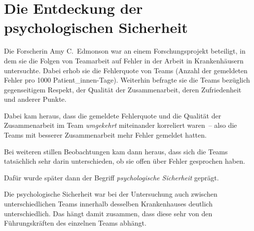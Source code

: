 \section{Die Entdeckung der psychologischen Sicherheit}
\label{ps-entdeckung}

Die Forscherin Amy C.~Edmonson \cite{the-fearless-organisation} war an einem Forschungsprojekt beteiligt, in dem sie die Folgen von Teamarbeit auf Fehler in der Arbeit in Krankenhäusern untersuchte. Dabei erhob sie die Fehlerquote von Teams (Anzahl der gemeldeten Fehler pro 1000 Patient\_innen-Tage). Weiterhin befragte sie die Teams bezüglich gegenseitigem Respekt, der Qualität der Zusammenarbeit, deren Zufriedenheit und anderer Punkte.

Dabei kam heraus, dass die gemeldete Fehlerquote und die Qualität der Zusammenarbeit im Team \emph{umgekehrt} miteinander korreliert waren~-- also die Teams mit besserer Zusammenarbeit mehr Fehler gemeldet hatten.

Bei weiteren stillen Beobachtungen kam dann heraus, dass sich die Teams tatsächlich sehr darin unterschieden, ob sie offen über Fehler gesprochen haben.

Dafür wurde später dann der Begriff \emph{psychologische Sicherheit} geprägt.

Die psychologische Sicherheit war bei der Untersuchung auch zwischen unterschiedlichen Teams innerhalb desselben Krankenhauses deutlich unterschiedlich. Das hängt damit zusammen, dass diese sehr von den Führungskräften des einzelnen Teams abhängt.
